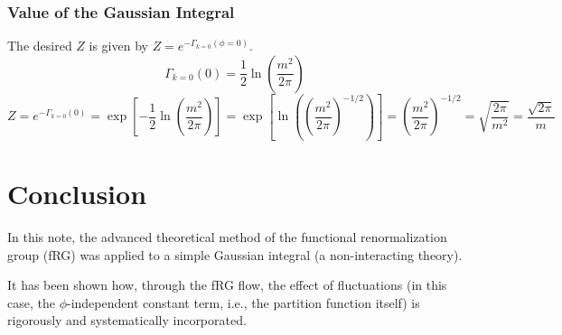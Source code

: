 \documentclass[uplatex,a4j,12pt,dvipdfmx]{jsarticle}
\begin{document}
\subsubsection{Value of the Gaussian Integral}

The desired $Z$ is given by $Z = e^{-\Gamma_{k=0}(\phi=0)}$.
\[
    \Gamma_{k=0}(0) = \frac{1}{2} \ln \left( \frac{m^2}{2\pi} \right)
\]
\[
    Z = e^{-\Gamma_{k=0}(0)} = \exp \left[ -\frac{1}{2} \ln \left( \frac{m^2}{2\pi} \right) \right]
    = \exp \left[ \ln \left( \left(\frac{m^2}{2\pi}\right)^{-1/2} \right) \right]
    = \left( \frac{m^2}{2\pi} \right)^{-1/2}
    = \sqrt{\frac{2\pi}{m^2}}
    = \frac{\sqrt{2\pi}}{m}
\]
\section{Conclusion}

In this note, the advanced theoretical method of the functional renormalization group (fRG)
was applied to a simple Gaussian integral (a non-interacting theory).

It has been shown how, through the fRG flow, the effect of fluctuations
(in this case, the $\phi$-independent constant term, i.e., the partition function itself)
is rigorously and systematically incorporated.
\end{document}
